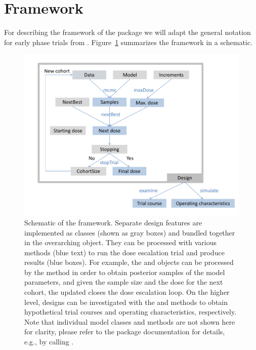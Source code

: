 \documentclass[article]{jss}\usepackage[]{graphicx}\usepackage[]{color}
\begin{document}
\section{Framework}\label{sec:framework}

For describing the framework of the package we will adapt the general notation
for early phase trials from \cite{Thall2010}. Figure~\ref{fig:schematic} summarizes
the framework in a schematic.

\begin{figure}
\centering 
\includegraphics[width=.8\linewidth]{schematic.pdf} 
\caption{Schematic of the framework. Separate design features are implemented as classes
(shown as gray boxes) and bundled together in the overarching  object. 
They can be processed with various methods (blue text) to run the dose escalation trial and produce results (blue boxes). For example, the  and  objects can be processed by the  method in order to obtain posterior samples of the model parameters, and given the sample size and the dose for the next cohort, the updated  closes the dose escalation loop. On the higher level, designs can be investigated with the  and  methods to obtain hypothetical trial courses and operating characteristics, respectively. Note that individual model classes and methods are not shown here for clarity, please refer to the package documentation for details, e.g., by calling .} 
\label{fig:schematic}
\end{figure}
\end{document}
